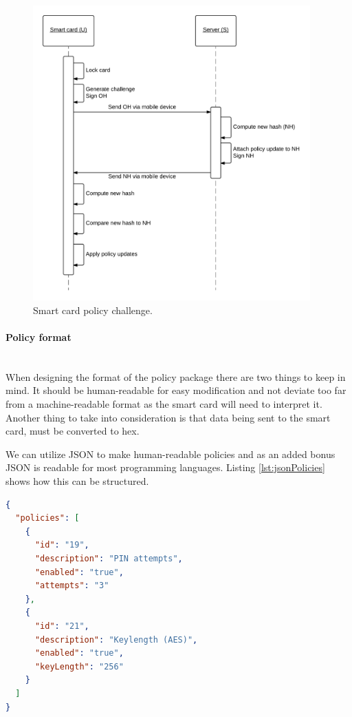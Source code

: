 \begin{figure}[h!]
  \caption{Smart card policy challenge.}
  \label{fig:SQD_policy}
  \centering
    \includegraphics[width=0.95\textwidth]{images/SQD_Policy_Exchange.png}
\end{figure}

\newpage

\paragraph{Policy format}\mbox{}\\
When designing the format of the policy package there are two things to keep in mind. It should be human-readable for easy modification and not deviate too far from a machine-readable format as the smart card will need to interpret it. Another thing to take into consideration is that data being sent to the smart card, must be converted to hex.

We can utilize JSON to make human-readable policies and as an added bonus JSON is readable for most programming languages. Listing \ref{lst:jsonPolicies} shows how this can be structured.
\begin{lstlisting}[language=json,firstnumber=1,caption=Human-readable policies in JSON., label=lst:jsonPolicies,]
{
  "policies": [
    {
      "id": "19",
      "description": "PIN attempts",
      "enabled": "true",
      "attempts": "3"
    },
    {
      "id": "21",
      "description": "Keylength (AES)",
      "enabled": "true",
      "keyLength": "256"
    }
  ]
}
\end{lstlisting}

